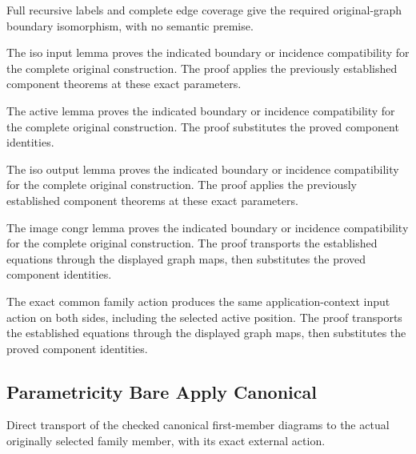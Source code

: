 Full recursive labels and complete edge coverage give the required
original-graph boundary isomorphism, with no semantic premise.
\par{}

The iso input lemma proves the indicated boundary or incidence compatibility for the complete original construction.
The proof applies the previously established component theorems at these exact parameters.
\par{}

The active lemma proves the indicated boundary or incidence compatibility for the complete original construction.
The proof substitutes the proved component identities.
\par{}

The iso output lemma proves the indicated boundary or incidence compatibility for the complete original construction.
The proof applies the previously established component theorems at these exact parameters.
\par{}

The image congr lemma proves the indicated boundary or incidence compatibility for the complete original construction.
The proof transports the established equations through the displayed graph maps, then substitutes the proved component identities.
\par{}

The exact common family action produces the same application-context
input action on both sides, including the selected active position.
The proof transports the established equations through the displayed graph maps, then substitutes the proved component identities.
\par{}

\subsection{Parametricity Bare Apply Canonical}
Direct transport of the checked canonical first-member diagrams to the
actual originally selected family member, with its exact external action.

